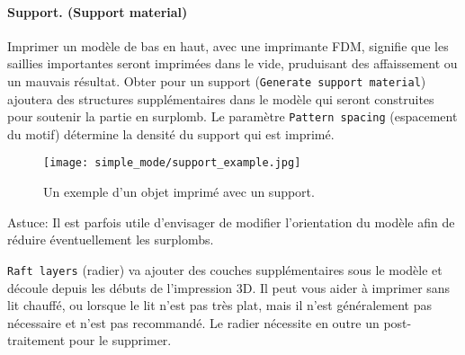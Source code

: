 
\paragraph{Support. (Support material)} %
\label{par:simple_support_material}
Imprimer un modèle de bas en haut, avec une imprimante FDM, signifie que les saillies importantes seront imprimées dans le vide, pruduisant des affaissement ou un mauvais résultat.  Obter pour un support (\texttt{Generate support material}) ajoutera des structures supplémentaires dans le modèle qui seront construites pour soutenir la partie en surplomb. Le paramètre \texttt{Pattern spacing} (espacement du motif) détermine la densité du support qui est imprimé.

\begin{figure}[H]
\centering
\texttt{[image: simple\_mode/support\_example.jpg]}
\caption{Un exemple d'un objet imprimé avec un support.}
\label{fig:support_example}
\end{figure}

Astuce: Il est parfois utile d'envisager de modifier l'orientation du modèle afin de réduire éventuellement les surplombs.

\texttt{Raft layers} (radier) va ajouter des couches supplémentaires sous le modèle et découle depuis les débuts de l'impression 3D. Il peut vous aider à imprimer sans lit chauffé, ou lorsque le lit n'est pas très plat, mais il n'est généralement pas nécessaire et n'est pas recommandé. Le radier nécessite en outre un post-traitement pour le supprimer.

